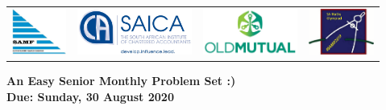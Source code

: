 \documentclass{article}
\begin{document}
\setlength{\tabcolsep}{5pt}
\begin{center} \begin{tabular}{cccc}
	\includegraphics[height=43pt]{SAMF_logo.jpg} &
	\includegraphics[height=43pt]{SAICA_logo.jpg} &
	\includegraphics[height=43pt]{OM_Logo_Stacked_Vignette_on_White_RGB.jpg} &
	\includegraphics[height=43pt]{SAMO2019.png}
\end{tabular} \end{center}

\bigskip

\begin{center}
\textbf{\Large An Easy Senior Monthly Problem Set :)}
\\ \vspace{1em}
\textbf{\large Due: Sunday, 30 August 2020}
\end{center}
\end{document}
